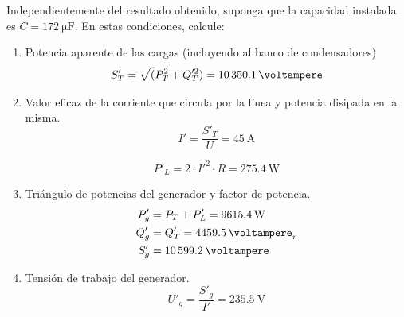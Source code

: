 \documentclass[12pt]{article}
\begin{document}
Independientemente del resultado obtenido, suponga que la capacidad instalada es $C = \SI{172}{\micro\farad}$. En estas condiciones, calcule:
\begin{enumerate}
\item Potencia aparente de las cargas (incluyendo al banco de condensadores)
\[
S'_T = \sqrt(P^2_T + Q'^2_T) = \SI{10350.1}{\voltampere}
\]

\item Valor eficaz de la corriente que circula por la línea y potencia disipada en la misma.
\[
I' = \frac{S'_T}{U} = \SI{45}{\ampere}
\]

\[
  P'_L = 2 \cdot I'^2 \cdot R = \SI{275.4}{\watt}
\]

\item Triángulo de potencias del generador y factor de potencia.
  \begin{align*}
    P'_g &= P_T + P'_L = \SI{9615.4}{\watt}\\
    Q'_g &= Q'_T = \SI{4459.5}{\voltampere}_r\\
    S'_g &= \SI{10599.2}{\voltampere}\\    
  \end{align*}

\item Tensión de trabajo del generador.
\[
U'_g = \frac{S'_g}{I'} = \SI{235.5}{\volt}
\]

\clearpage

\section{}









\end{enumerate}
\end{document}
